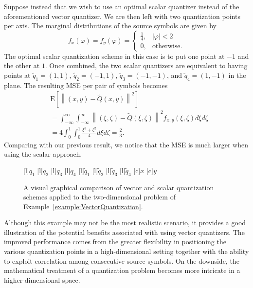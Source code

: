 \begin{example}
Suppose instead that we wish to use an optimal scalar quantizer instead of the aforementioned vector quantizer.
We are then left with two quantization points per axis.
The marginal distributions of the source symbols are given by
\begin{equation*}
f_x (\varphi) = f_y (\varphi)
= \begin{cases} \frac{1}{4}, & |\varphi| < 2 \\
0, & \text{otherwise} . \end{cases}
\end{equation*}
The optimal scalar quantization scheme in this case is to put one point at $-1$ and the other at $1$.
Once combined, the two scalar quantizers are equivalent to having points at $\tilde{q}_1 = (1,1)$, $\tilde{q}_2 = (-1,1)$, $\tilde{q}_3 = (-1,-1)$, and $\tilde{q}_4 = (1,-1)$ in the plane.
The resulting MSE per pair of symbols becomes
\begin{equation*}
\begin{split}
&\mathrm{E} \left[ \left\| (x,y) - \tilde{Q}(x,y) \right\|^2 \right] \\
&= \int_{-\infty}^{\infty} \int_{-\infty}^{\infty}
\left\| (\xi, \zeta) - \tilde{Q}(\xi, \zeta) \right\|^2 f_{x,y}(\xi,\zeta) d\xi d\zeta \\
&= 4 \int_0^1 \int_0^1 \frac{\xi^2 + \zeta^2}{4} d\xi d\zeta
= \frac{2}{3} .
\end{split}
\end{equation*}
Comparing with our previous result, we notice that the MSE is much larger when using the scalar approach.
\begin{figure}[htbp]
\begin{center}
\begin{psfrags}
[l]{$q_1$}
[l]{$q_2$}
[l]{$q_3$}
[l]{$q_4$}
[l]{$\tilde{q}_1$}
[l]{$\tilde{q}_2$}
[l]{$\tilde{q}_3$}
[l]{$\tilde{q}_4$}
[c]{$x$}
[c]{$y$}
\end{psfrags}
\caption{A visual graphical comparison of vector and scalar quantization schemes applied to the two-dimensional problem of Example~\ref{example:VectorQuantization}.}
\label{figure:VectorQuantizer}
\end{center}
\end{figure}
\end{example}

Although this example may not be the most realistic scenario, it provides a good illustration of the potential benefits associated with using vector quantizers.
The improved performance comes from the greater flexibility in positioning the various quantization points in a high-dimensional setting together with the ability to exploit correlation among consecutive source symbols.
On the downside, the mathematical treatment of a quantization problem becomes more intricate in a higher-dimensional space.


